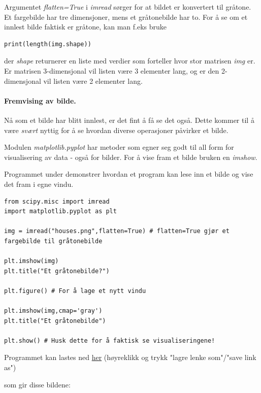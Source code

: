 \documentclass[%
oneside,                 %
final,                   %
10pt,norsk]{article}
\begin{document}
Argumentet \emph{flatten=True} i \emph{imread} sørger for at bildet er konvertert til gråtone. Et fargebilde har tre dimensjoner, mens et gråtonebilde har to.
For å se om et innlest bilde faktisk er gråtone, kan man f.eks bruke
\begin{verbatim}
print(length(img.shape))
\end{verbatim}
der \emph{shape} returnerer en liste med verdier som forteller hvor stor matrisen \emph{img} er. Er matrisen 3-dimensjonal vil listen være 3 elementer lang, og er den 2-dimensjonal vil listen være 2 elementer lang.

\paragraph{Fremvising av bilde.}
Nå som et bilde har blitt innlest, er det fint å få se det også. Dette kommer til å være \emph{svært} nyttig for å se hvordan diverse operasjoner påvirker et bilde.

Modulen \emph{matplotlib.pyplot} har metoder som egner seg godt til all form for visualisering av data - også for bilder. For å vise fram et bilde bruken en \emph{imshow}.

Programmet under demonstrer hvordan et program kan lese inn et bilde og vise det fram i egne vindu.
\begin{verbatim}
from scipy.misc import imread
import matplotlib.pyplot as plt

img = imread("houses.png",flatten=True) # flatten=True gjør et fargebilde til gråtonebilde

plt.imshow(img)
plt.title("Et gråtonebilde?")

plt.figure() # For å lage et nytt vindu

plt.imshow(img,cmap='gray')
plt.title("Et gråtonebilde")

plt.show() # Husk dette for å faktisk se visualiseringene!
\end{verbatim}
Programmet kan lastes ned \href{{https://github.com/krisbhei/INF2310/raw/master/Programmering/Python/fremvising.py}}{her} (høyreklikk og trykk "lagre lenke som"/"save link as")

som gir disse bildene:
\end{document}
